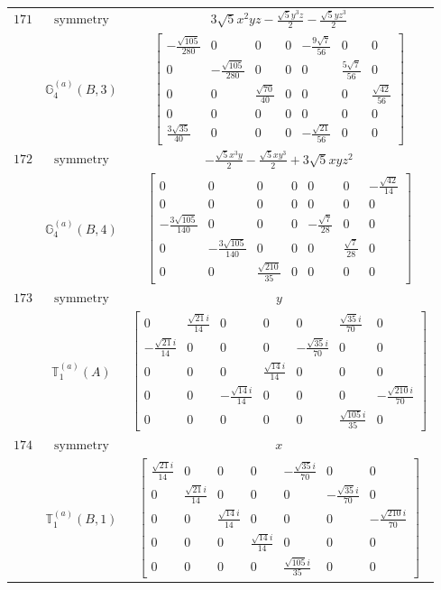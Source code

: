 \documentclass[fleqn,8pt,landscape]{jsarticle}
\begin{document}
\begin{longtable}{ccc}
$ 171 $ & $ \text{symmetry} $ & $ 3 \sqrt{5} x^{2} y z - \frac{\sqrt{5} y^{3} z}{2} - \frac{\sqrt{5} y z^{3}}{2} $ \\
$  $ & $ \mathbb{G}_{4}^{(a)}(B,3) $ & $ \begin{bmatrix} - \frac{\sqrt{105}}{280} & 0 & 0 & 0 & - \frac{9 \sqrt{7}}{56} & 0 & 0 \\ 0 & - \frac{\sqrt{105}}{280} & 0 & 0 & 0 & \frac{5 \sqrt{7}}{56} & 0 \\ 0 & 0 & \frac{\sqrt{70}}{40} & 0 & 0 & 0 & \frac{\sqrt{42}}{56} \\ 0 & 0 & 0 & 0 & 0 & 0 & 0 \\ \frac{3 \sqrt{35}}{40} & 0 & 0 & 0 & - \frac{\sqrt{21}}{56} & 0 & 0 \end{bmatrix} $ \\ \hline
$ 172 $ & $ \text{symmetry} $ & $ - \frac{\sqrt{5} x^{3} y}{2} - \frac{\sqrt{5} x y^{3}}{2} + 3 \sqrt{5} x y z^{2} $ \\
$  $ & $ \mathbb{G}_{4}^{(a)}(B,4) $ & $ \begin{bmatrix} 0 & 0 & 0 & 0 & 0 & 0 & - \frac{\sqrt{42}}{14} \\ 0 & 0 & 0 & 0 & 0 & 0 & 0 \\ - \frac{3 \sqrt{105}}{140} & 0 & 0 & 0 & - \frac{\sqrt{7}}{28} & 0 & 0 \\ 0 & - \frac{3 \sqrt{105}}{140} & 0 & 0 & 0 & \frac{\sqrt{7}}{28} & 0 \\ 0 & 0 & \frac{\sqrt{210}}{35} & 0 & 0 & 0 & 0 \end{bmatrix} $ \\ \hline
$ 173 $ & $ \text{symmetry} $ & $ y $ \\
$  $ & $ \mathbb{T}_{1}^{(a)}(A) $ & $ \begin{bmatrix} 0 & \frac{\sqrt{21} i}{14} & 0 & 0 & 0 & \frac{\sqrt{35} i}{70} & 0 \\ - \frac{\sqrt{21} i}{14} & 0 & 0 & 0 & - \frac{\sqrt{35} i}{70} & 0 & 0 \\ 0 & 0 & 0 & \frac{\sqrt{14} i}{14} & 0 & 0 & 0 \\ 0 & 0 & - \frac{\sqrt{14} i}{14} & 0 & 0 & 0 & - \frac{\sqrt{210} i}{70} \\ 0 & 0 & 0 & 0 & 0 & \frac{\sqrt{105} i}{35} & 0 \end{bmatrix} $ \\ \hline
$ 174 $ & $ \text{symmetry} $ & $ x $ \\
$  $ & $ \mathbb{T}_{1}^{(a)}(B,1) $ & $ \begin{bmatrix} \frac{\sqrt{21} i}{14} & 0 & 0 & 0 & - \frac{\sqrt{35} i}{70} & 0 & 0 \\ 0 & \frac{\sqrt{21} i}{14} & 0 & 0 & 0 & - \frac{\sqrt{35} i}{70} & 0 \\ 0 & 0 & \frac{\sqrt{14} i}{14} & 0 & 0 & 0 & - \frac{\sqrt{210} i}{70} \\ 0 & 0 & 0 & \frac{\sqrt{14} i}{14} & 0 & 0 & 0 \\ 0 & 0 & 0 & 0 & \frac{\sqrt{105} i}{35} & 0 & 0 \end{bmatrix} $ \\ \hline

\end{longtable}
\end{document}
